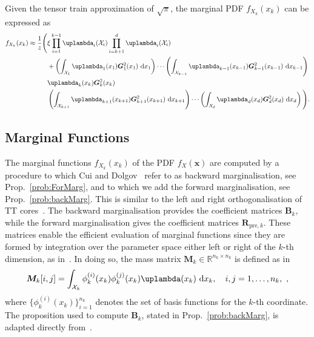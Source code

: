 Given the tensor train approximation of $\sqrt{\pi}$, the marginal PDF $f_{X_k}(x_k)$ can be expressed as
\begin{align}
	\begin{split}
		f_{X_k}(x_k)  \approx \frac{1}{z} \Bigg(&\xi \prod_{i=1}^{k-1} \uplambda_i(\mathcal{X}_i) \prod_{i=k+1}^{d} \uplambda_i(\mathcal{X}_i) \\
		&+ \left( \int_{\mathcal{X}_1} \uplambda_1(x_1) \bm{G}_1^2(x_1)  \, \diff x_1 \right) \cdots 
		\left( \int_{\mathcal{X}_{k-1}} \uplambda_{k-1}(x_{k-1}) \bm{G}_{k-1}^2(x_{k-1}) \, \diff x_{k-1} \right) \\
		& \uplambda_k(x_k) \bm{G}_k^2(x_k)  \\
		&\left( \int_{\mathcal{X}_{k+1}} \uplambda_{k+1}(x_{k+1}) \bm{G}_{k+1}^2(x_{k+1})  \,\diff x_{k+1} \right) \cdots 
		\left( \int_{\mathcal{X}_d} \uplambda_d(x_d) \bm{G}_d^2(x_d)  \, \diff x_d \right) \Bigg).
	\end{split}
\end{align}




\subsection{Marginal Functions}
\label{subsec:TTMarg}
The marginal functions $f_{X_k}(x_k)$ of the PDF $f_{X}(\bm{x})$ are computed by a procedure to which Cui and Dolgov~\cite{cui2022deep} refer to as backward marginalisation, see Prop.~\ref{prob:ForMarg}, and to which we add the forward marginalisation, see Prop.~\ref{prob:backMarg}. 
This is similar to the left and right orthogonalisation of TT cores~\cite{oseledets2011tensor, Oseledets2011DMRG}.
The backward marginalisation provides the coefficient matrices $\bm{B}_k$, while the forward marginalisation gives the coefficient matrices $\bm{R}_{\text{pre}, k}$. 
These matrices enable the efficient evaluation of marginal functions since they are formed by integration over the parameter space either left or right of the $k$-th dimension, as in~\cite{cui2022deep}. 
In doing so, the mass matrix $\bm{M}_k \in \mathbb{R}^{n_k \times n_k}$ is defined as in \cite[Eq.~22]{cui2022deep}
\begin{equation}
	\bm{M}_k[i, j] = \int_{\mathcal{X}_k} \phi^{(i)}_k(x_k) \phi^{(j)}_k(x_k) \uplambda(x_k) \, \diff x_k, \quad i, j = 1, \dots, n_k, \, \,   \label{eq:MassMat},
\end{equation}
where $\{\phi^{(i)}_k(x_k)\}_{i=1}^{n_k}$ denotes the set of basis functions for the $k$-th coordinate.
The proposition used to compute $\bm{B}_k$, stated in Prop.~\ref{prob:backMarg}, is adapted directly from~\cite{cui2022deep}.

